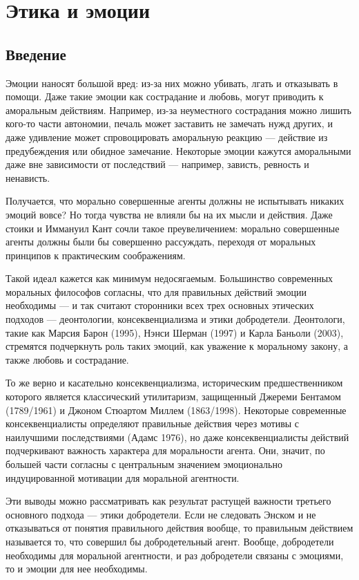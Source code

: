 \documentclass[11pt]{book}
\begin{document}
\chapter{Этика и эмоции}

\section{Введение}

Эмоции наносят большой вред: из-за них можно убивать, лгать и отказывать в помощи. Даже такие эмоции как сострадание и любовь, могут приводить к аморальным действиям. Например, из-за неуместного сострадания можно лишить кого-то части автономии, печаль может заставить не замечать нужд других, и даже удивление может спровоцировать аморальную реакцию --- действие из предубеждения или обидное замечание. Некоторые эмоции кажутся аморальными даже вне зависимости от последствий --- например, зависть, ревность и ненависть.

Получается, что морально совершенные агенты должны не испытывать никаких эмоций вовсе? Но тогда чувства не влияли бы на их мысли и действия. Даже стоики и Иммануил Кант сочли такое преувеличением: морально совершенные агенты должны были бы совершенно рассуждать, переходя от моральных принципов к практическим соображениям.

Такой идеал кажется как минимум недосягаемым. Большинство современных моральных философов согласны, что для правильных действий эмоции необходимы --- и так считают сторонники всех трех основных этических подходов --- деонтологии, консеквенциализма и этики добродетели. Деонтологи, такие как Марсия Барон (1995), Нэнси Шерман (1997) и Карла Баньоли (2003), стремятся подчеркнуть роль таких эмоций, как уважение к моральному закону, а также любовь и сострадание.

То же верно и касательно консеквенциализма, историческим предшественником которого является классический утилитаризм, защищенный Джереми Бентамом (1789/1961) и Джоном Стюартом Миллем (1863/1998). Некоторые современные консеквенциалисты определяют правильные действия через мотивы с наилучшими последствиями (Адамс 1976), но даже консеквенциалисты действий подчеркивают важность характера для моральности агента. Они, значит, по большей части согласны с центральным значением эмоционально индуцированной мотивации для моральной агентности.

Эти выводы можно рассматривать как результат растущей важности третьего основного подхода --- этики добродетели. Если не следовать Энском и не отказываться от понятия правильного действия вообще, то правильным действием называется то, что совершил бы добродетельный агент. Вообще, добродетели необходимы для моральной агентности, и раз добродетели связаны с эмоциями, то и эмоции для нее необходимы.
\end{document}
